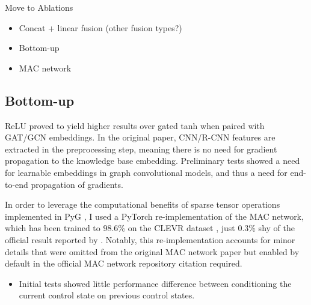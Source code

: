 {\color{red}

Move to Ablations

\begin{itemize}
  \item Concat + linear fusion (other fusion types?)
  \item Bottom-up
  \item MAC network
\end{itemize}

\subsection{Bottom-up}
\label{subsection:bottom_up}
 ReLU proved to yield higher results over gated tanh when paired with GAT/GCN embeddings. In the original paper, CNN/R-CNN features are extracted in the preprocessing step, meaning there is no need for gradient propagation to the knowledge base embedding. Preliminary tests showed a need for learnable embeddings in graph convolutional models, and thus a need for end-to-end propagation of gradients.}


In order to leverage the computational benefits of sparse tensor operations implemented in PyG \cite{fey2019fast}, I used a PyTorch \cite{paszke2019pytorch} re-implementation of the MAC network, which has been trained to 98.6\% on the CLEVR dataset \cite{eyzaguirre2020differentiable}, just 0.3\% shy of the official result reported by 
\citeauthor{hudson2018compositional}. Notably, this re-implementation accounts for minor details that were omitted from the original MAC network paper but enabled by default in the official MAC network repository {\color{red} citation required}.

\begin{itemize}
  \item Initial tests showed little performance difference between conditioning the current control state on previous control states. %
\end{itemize}
